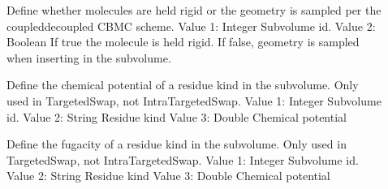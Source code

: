 \documentclass[letterpaper,10pt,english]{sphinxmanual}
\begin{document}
\begin{description}
\item[{}] \leavevmode
\sphinxAtStartPar
Define whether molecules are held rigid or the geometry is sampled per the coupled\sphinxhyphen{}decoupled CBMC scheme.
\sphinxhyphen{} Value 1: Integer \sphinxhyphen{} Sub\sphinxhyphen{}volume id.
\sphinxhyphen{} Value 2: Boolean \sphinxhyphen{} If true the molecule is held rigid.  If false, geometry is sampled when inserting in the subvolume.

\item[{}] \leavevmode
\sphinxAtStartPar
Define the chemical potential of a residue kind in the subvolume.  Only used in TargetedSwap, not IntraTargetedSwap.
\sphinxhyphen{} Value 1: Integer \sphinxhyphen{} Sub\sphinxhyphen{}volume id.
\sphinxhyphen{} Value 2: String \sphinxhyphen{} Residue kind
\sphinxhyphen{} Value 3: Double \sphinxhyphen{} Chemical potential

\item[{}] \leavevmode
\sphinxAtStartPar
Define the fugacity of a residue kind in the subvolume.  Only used in TargetedSwap, not IntraTargetedSwap.
\sphinxhyphen{} Value 1: Integer \sphinxhyphen{} Sub\sphinxhyphen{}volume id.
\sphinxhyphen{} Value 2: String \sphinxhyphen{} Residue kind
\sphinxhyphen{} Value 3: Double \sphinxhyphen{} Chemical potential

\end{description}
\end{document}

